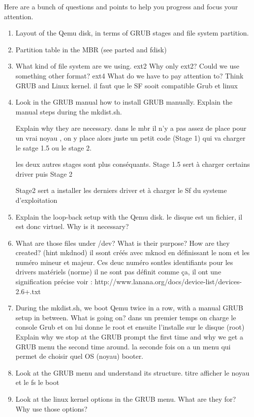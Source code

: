 \documentclass[10]{article}
\begin{document}
Here are a bunch of questions and points to help you progress
and focus your attention.

\begin{enumerate}
\item
Layout of the Qemu disk, in terms of GRUB stages and file system partition.
\item
Partition table in the MBR (see parted and fdisk)
\item 
What kind of file system are we using. ext2
Why only ext2? Could we use something other format? ext4
What do we have to pay attention to? Think GRUB
and Linux kernel. il faut que le SF sooit compatible Grub et linux
\item
Look in the GRUB manual how to install GRUB manually.
Explain the manual steps during the mkdist.sh.

Explain why they are necessary. 
dans le mbr il n'y a pas assez de place pour un vrai noyau , on y place alors juste un petit code (Stage 1) qui va charger le satge 1.5 ou le stage 2.

les deux autres stages sont  plus cons\'equants. Stage 1.5 sert \`a charger certains driver puis Stage 2

Stage2 sert a installer les derniers driver et \`a charger le Sf du systeme d'exploitation
\item
Explain the loop-back setup with the Qemu disk.
le disque est un fichier, il est donc virtuel. 
Why is it necessary? 
\item 
What are those files under /dev?
What is their purpose? How are they created? (hint mkdnod)
il ssont cr\'e\'es avec mknod en d\'efinissant le nom et les num\'ero mineur et majeur. Ces deuc num\'ero sontles identifiants pour les drivers mat\'eriels (norme) il ne sont pas d\'efinit comme ça, il ont une signification pr\'ecise 
voir : http://www.lanana.org/docs/device-list/devices-2.6+.txt
\item 
During the mkdist.sh, we boot Qemu twice in a row, 
with a manual GRUB setup in between.
What is going on? 
dans un premier temps on charge le console Grub et on lui donne le root et ensuite l'installe sur le disque (root) 
Explain why we stop at the GRUB prompt the first time
and why we get a GRUB menu the second time around.
la seconde fois on a un menu qui permet de choisir quel OS (noyau) booter.
\item 
Look at the GRUB menu and understand its structure.
titre afficher
le noyau et le fs
le boot
\item 
Look at the linux kernel options in the GRUB menu.
What are they for? Why use those options?


\end{enumerate}
\end{document}
